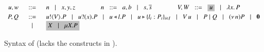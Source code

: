 	\begin{figure}[t]
	\[ 
		\begin{array}{rcl}
			u,w  &\bnfis& n \bnfbar x,y,z
			\qquad \qquad
			n \bnfis a,b \bnfbar s, \dual{s} 
			\qquad \qquad
			V,W \bnfis \nonhosyntax{u} \bnfbar \abs{x}{P}
			\\[1mm]

			P,Q
			& \bnfis &
			\bout{u}{V}{P}  \bnfbar  \binp{u}{x}{P} \bnfbar
			\bsel{u}{l} P \bnfbar \bbra{u}{l_i:P_i}_{i \in I} \bnfbar \appl{V}{u}\bnfbar P\Par Q \bnfbar \news{n} P 
			\bnfbar \inact
			\\%
			& \bnfbar &
			\nonhosyntax{\rvar{X} \bnfbar \recp{X}{P}}
		\end{array}
	\]
	\caption{Syntax of \HOp (\HO lacks the constructs in ).}
	\label{fig:syntax}
\end{figure}

